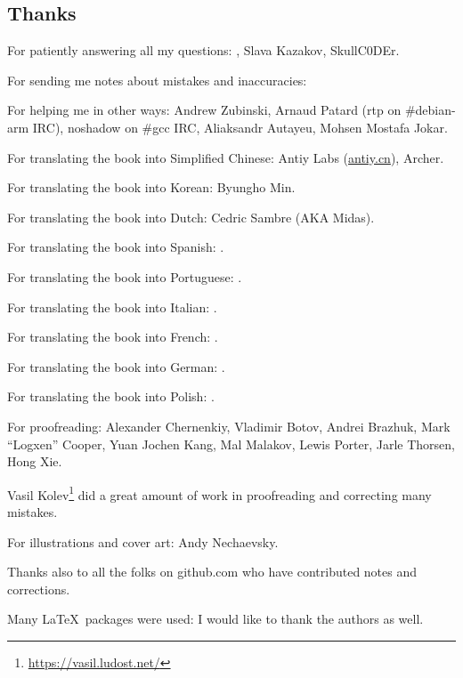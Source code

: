 \subsection*{Thanks}

For patiently answering all my questions: \HERMIT, Slava  Kazakov, SkullC0DEr.

For sending me notes about mistakes and inaccuracies: \PeopleMistakesInaccuracies{}

For helping me in other ways:
Andrew Zubinski,
Arnaud Patard (rtp on \#debian-arm IRC),
noshadow on \#gcc IRC,
Aliaksandr Autayeu,
Mohsen Mostafa Jokar.

For translating the book into Simplified Chinese:
Antiy Labs (\href{http://antiy.cn}{antiy.cn}), Archer.

For translating the book into Korean: Byungho Min.

For translating the book into Dutch: Cedric Sambre (AKA Midas).

For translating the book into Spanish: \PeopleSpanishTranslators{}.

For translating the book into Portuguese: \PeoplePTBRTranslators{}.

For translating the book into Italian: \PeopleItalianTranslators{}.

For translating the book into French: \PeopleFrenchTranslators{}.

For translating the book into German: \PeopleGermanTranslators{}.

For translating the book into Polish: \PeoplePolishTranslators{}.

For proofreading:
Alexander  Chernenkiy,
Vladimir Botov,
Andrei Brazhuk,
Mark ``Logxen'' Cooper, Yuan Jochen Kang, Mal Malakov, Lewis Porter, Jarle Thorsen, Hong Xie.

Vasil Kolev\footnote{\url{https://vasil.ludost.net/}} did a great amount of work in proofreading and correcting many mistakes.

For illustrations and cover art: Andy Nechaevsky.

Thanks also to all the folks on github.com who have contributed notes and corrections\FNGithubContributors{}.

Many \LaTeX\ packages were used: I would like to thank the authors as well.

